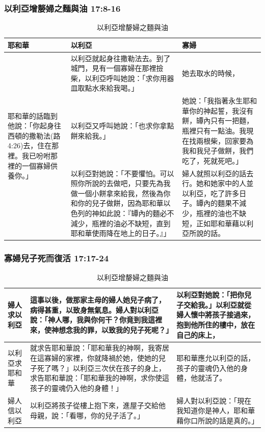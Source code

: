 \subsubsection{以利亞增嫠婦之麵與油 17:8-16} 
\begin{table}[H]
\centering 
\begin{tabular}{p{1.6cm}|p{9cm}|p{}}\hline\hline
耶和華&以利亞&寡婦\\\hline
\multirow{3}{1.76cm}{耶和華的話臨到他說：「你起身往西頓的撒勒法(路4:26)去，住在那裡。我已吩咐那裡的一個寡婦供養你。」} 
&以利亞就起身往撒勒法去。到了城門，見有一個寡婦在那裡撿柴，以利亞呼叫她說：「求你用器皿取點水來給我喝。」 
&她去取水的時候，\\\cline{2-3}
&以利亞又呼叫她說：「也求你拿點餅來給我。」&她說：「我指著永生耶和華你的神起誓，我沒有餅，罈內只有一把麵，瓶裡只有一點油。我現在找兩根柴，回家要為我和我兒子做餅，我們吃了，死就死吧。」\\\cline{2-3}
&以利亞對她說：「不要懼怕。可以照你所說的去做吧，只要先為我做一個小餅拿來給我，然後為你和你的兒子做餅，因為耶和華以色列的神如此說：『罈內的麵必不減少，瓶裡的油必不缺短，直到耶和華使雨降在地上的日子。』」&婦人就照以利亞的話去行。她和她家中的人並以利亞，吃了許多日子。罈內的麵果不減少，瓶裡的油也不缺短，正如耶和華藉以利亞所說的話。\\\hline
\end{tabular}
\caption{以利亞增嫠婦之麵與油}
\end{table}

\subsubsection{寡婦兒子死而復活 17:17-24} 
\begin{table}[H]
\centering 
\begin{tabular}{p{1.6cm}|p{9cm}|p{}}\hline\hline
婦人求以利亞&這事以後，做那家主母的婦人她兒子病了，病得甚重，以致身無氣息。婦人對以利亞說：「神人哪，我與你何干？你竟到我這裡來，使神想念我的罪，以致我的兒子死呢？」&以利亞對她說：「把你兒子交給我。」以利亞就從婦人懷中將孩子接過來，抱到他所住的樓中，放在自己的床上，\\\hline
以利亞求耶和華&就求告耶和華說：「耶和華我的神啊，我寄居在這寡婦的家裡，你就降禍於她，使她的兒子死了嗎？」以利亞三次伏在孩子的身上，求告耶和華說：「耶和華我的神啊，求你使這孩子的靈魂仍入他的身體！」&耶和華應允以利亞的話，孩子的靈魂仍入他的身體，他就活了。\\\hline
婦人信以利亞&以利亞將孩子從樓上抱下來，進屋子交給他母親，說：「看哪，你的兒子活了。」&婦人對以利亞說：「現在我知道你是神人，耶和華藉你口所說的話是真的。」\\\hline
\end{tabular}
\caption{以利亞增嫠婦之麵與油}
\end{table}


